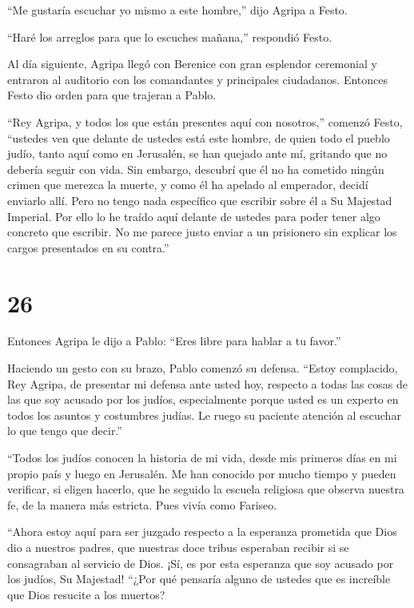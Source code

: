  ``Me gustaría escuchar yo mismo a este hombre,'' dijo
Agripa a Festo.

``Haré los arreglos para que lo escuches mañana,'' respondió Festo.

 Al día siguiente, Agripa llegó con Berenice con gran
esplendor ceremonial y entraron al auditorio con los comandantes y
principales ciudadanos. Entonces Festo dio orden para que trajeran a
Pablo.

 ``Rey Agripa, y todos los que están presentes aquí con
nosotros,'' comenzó Festo, ``ustedes ven que delante de ustedes está
este hombre, de quien todo el pueblo judío, tanto aquí como en
Jerusalén, se han quejado ante mí, gritando que no debería seguir con
vida.  Sin embargo, descubrí que él no ha cometido ningún
crimen que merezca la muerte, y como él ha apelado al emperador, decidí
enviarlo allí.  Pero no tengo nada específico que escribir
sobre él a Su Majestad Imperial. Por ello lo he traído aquí delante de
ustedes para poder tener algo concreto que escribir.  No me
parece justo enviar a un prisionero sin explicar los cargos presentados
en su contra.''

\hypertarget{section-25}{%
\section{26}\label{section-25}}

 Entonces Agripa le dijo a Pablo: ``Eres libre para hablar a
tu favor.''

Haciendo un gesto con su brazo, Pablo comenzó su defensa. 
``Estoy complacido, Rey Agripa, de presentar mi defensa ante usted hoy,
respecto a todas las cosas de las que soy acusado por los judíos,
 especialmente porque usted es un experto en todos los
asuntos y costumbres judías. Le ruego su paciente atención al escuchar
lo que tengo que decir.''

 ``Todos los judíos conocen la historia de mi vida, desde
mis primeros días en mi propio país y luego en Jerusalén. 
Me han conocido por mucho tiempo y pueden verificar, si eligen hacerlo,
que he seguido la escuela religiosa que observa nuestra fe, de la manera
más estricta. Pues vivía como Fariseo.

 ``Ahora estoy aquí para ser juzgado respecto a la esperanza
prometida que Dios dio a nuestros padres,  que nuestras doce
tribus esperaban recibir si se consagraban al servicio de Dios. ¡Sí, es
por esta esperanza que soy acusado por los judíos, Su Majestad!
 ``¿Por qué pensaría alguno de ustedes que es increíble que
Dios resucite a los muertos?

